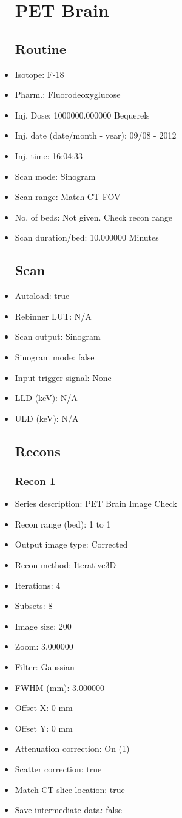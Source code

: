 \documentclass[12pt]{article}
\begin{document}
\begin{itemize}
\section{PET Brain}\subsection{Routine}
\item Isotope: F-18
\item Pharm.: Fluorodeoxyglucose
\item Inj. Dose: 1000000.000000 Bequerels
\item Inj. date (date/month - year): 09/08 - 2012
\item Inj. time: 16:04:33
\item Scan mode: Sinogram
\item Scan range: Match CT FOV
\item No. of beds: Not given. Check recon range
\item Scan duration/bed: 10.000000 Minutes
\subsection{Scan}
\item Autoload: true
\item Rebinner LUT: N/A
\item Scan output: Sinogram
\item Sinogram mode: false
\item Input trigger signal: None
\item LLD (keV): N/A
\item ULD (keV): N/A
\subsection{Recons}
\subsubsection{Recon 1}
\item Series description: PET Brain Image Check
\item Recon range (bed): 1 to 1
\item Output image type: Corrected
\item Recon method: Iterative3D
\item Iterations: 4
\item Subsets: 8
\item Image size: 200
\item Zoom: 3.000000
\item Filter: Gaussian
\item FWHM (mm): 3.000000
\item Offset X: 0 mm
\item Offset Y: 0 mm
\item Attenuation correction: On (1)
\item Scatter correction: true
\item Match CT slice location: true
\item Save intermediate data: false

\end{itemize}
\end{document}
